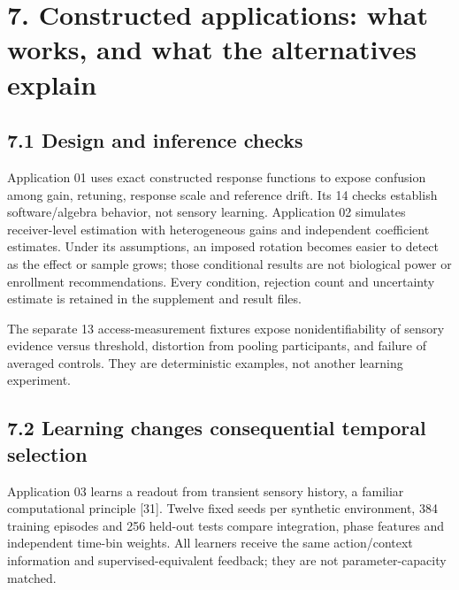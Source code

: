 \documentclass[
  american,
  11pt,
  letterpaper,
]{article}
\begin{document}
\clearpage

\section{7. Constructed applications: what works, and what the alternatives explain}\label{constructed-applications-what-works-and-what-the-alternatives-explain}

\subsection{7.1 Design and inference checks}\label{design-and-inference-checks}

Application 01 uses exact constructed response functions to expose confusion among gain, retuning, response scale and reference drift. Its 14 checks establish software/algebra behavior, not sensory learning. Application 02 simulates receiver-level estimation with heterogeneous gains and independent coefficient estimates. Under its assumptions, an imposed rotation becomes easier to detect as the effect or sample grows; those conditional results are not biological power or enrollment recommendations. Every condition, rejection count and uncertainty estimate is retained in the supplement and result files.

The separate 13 access-measurement fixtures expose nonidentifiability of sensory evidence versus threshold, distortion from pooling participants, and failure of averaged controls. They are deterministic examples, not another learning experiment.

\subsection{7.2 Learning changes consequential temporal selection}\label{learning-changes-consequential-temporal-selection}

Application 03 learns a readout from transient sensory history, a familiar computational principle {[}31{]}. Twelve fixed seeds per synthetic environment, 384 training episodes and 256 held-out tests compare integration, phase features and independent time-bin weights. All learners receive the same action/context information and supervised-equivalent feedback; they are not parameter-capacity matched.
\end{document}
